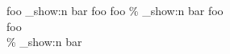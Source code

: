 \ExplSyntaxOff
foo \tl_show:n { bar }  %
foo %
foo \% \tl_show:n { bar }  %
foo \\%
foo \\\% \tl_show:n { bar }  %
